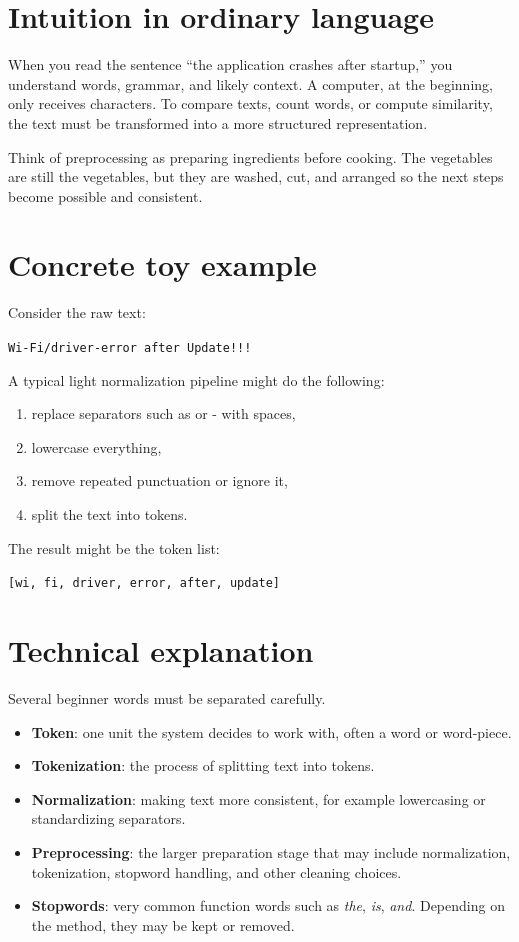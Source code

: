 \documentclass[11pt,oneside]{report}
\newcommand{\term}[1]{\textbf{#1}}
\newcommand{\code}[1]{\texttt{#1}}
\begin{document}
\section*{Intuition in ordinary language}
When you read the sentence ``the application crashes after startup,'' you understand words, grammar, and likely context. A computer, at the beginning, only receives characters. To compare texts, count words, or compute similarity, the text must be transformed into a more structured representation.

\begin{intuitionbox}
Think of preprocessing as preparing ingredients before cooking. The vegetables are still the vegetables, but they are washed, cut, and arranged so the next steps become possible and consistent.
\end{intuitionbox}

\section*{Concrete toy example}
Consider the raw text:
\begin{center}
\code{Wi-Fi/driver-error after Update!!!}
\end{center}
A typical light normalization pipeline might do the following:
\begin{enumerate}
\item replace separators such as \/ or - with spaces,
\item lowercase everything,
\item remove repeated punctuation or ignore it,
\item split the text into tokens.
\end{enumerate}
The result might be the token list:
\begin{center}
\code{[wi, fi, driver, error, after, update]}
\end{center}

\section*{Technical explanation}
Several beginner words must be separated carefully.
\begin{itemize}
\item \term{Token}: one unit the system decides to work with, often a word or word-piece.
\item \term{Tokenization}: the process of splitting text into tokens.
\item \term{Normalization}: making text more consistent, for example lowercasing or standardizing separators.
\item \term{Preprocessing}: the larger preparation stage that may include normalization, tokenization, stopword handling, and other cleaning choices.
\item \term{Stopwords}: very common function words such as \emph{the}, \emph{is}, \emph{and}. Depending on the method, they may be kept or removed.
\end{itemize}
\end{document}

